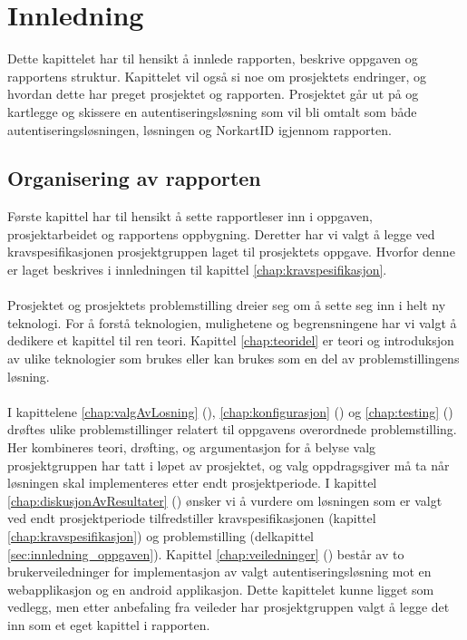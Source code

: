 \chapter{Innledning}
\label{innledning}
Dette kapittelet har til hensikt å innlede rapporten, beskrive oppgaven og rapportens struktur. Kapittelet vil også si noe om prosjektets endringer, og hvordan dette har preget prosjektet og rapporten. Prosjektet går ut på og kartlegge og skissere en autentiseringsløsning som vil bli omtalt som både autentiseringsløsningen, løsningen og NorkartID igjennom rapporten.
   
\section{Organisering av rapporten}
\label{sec:innledning_organiseringAvRapporten}
Første kapittel har til hensikt å sette rapportleser inn i oppgaven, prosjektarbeidet og rapportens oppbygning. Deretter har vi valgt å legge ved kravspesifikasjonen prosjektgruppen laget til prosjektets oppgave. Hvorfor denne er laget beskrives i innledningen til kapittel \ref{chap:kravspesifikasjon}.
\\
\\
Prosjektet og prosjektets problemstilling dreier seg om å sette seg inn i helt ny teknologi. For å forstå teknologien, mulighetene og begrensningene har vi valgt å dedikere et kapittel til ren teori. Kapittel \ref{chap:teoridel} er teori og introduksjon av ulike teknologier som brukes eller kan brukes som en del av problemstillingens løsning.
\\
\\
I kapittelene \ref{chap:valgAvLosning} (), \ref{chap:konfigurasjon} () og \ref{chap:testing} () drøftes ulike problemstillinger relatert til oppgavens overordnede problemstilling. Her kombineres teori, drøfting, og argumentasjon for å belyse valg prosjektgruppen har tatt i løpet av prosjektet, og valg oppdragsgiver må ta når løsningen skal implementeres etter endt prosjektperiode. I kapittel \ref{chap:diskusjonAvResultater} () ønsker vi å vurdere om løsningen som er valgt ved endt prosjektperiode tilfredstiller kravspesifikasjonen (kapittel \ref{chap:kravspesifikasjon}) og problemstilling (delkapittel \ref{sec:innledning_oppgaven}). Kapittel \ref{chap:veiledninger} () består av to brukerveiledninger for implementasjon av valgt autentiseringsløsning mot en webapplikasjon og en android applikasjon. Dette kapittelet kunne ligget som vedlegg, men etter anbefaling fra veileder har prosjektgruppen valgt å legge det inn som et eget kapittel i rapporten.
\\
\\

